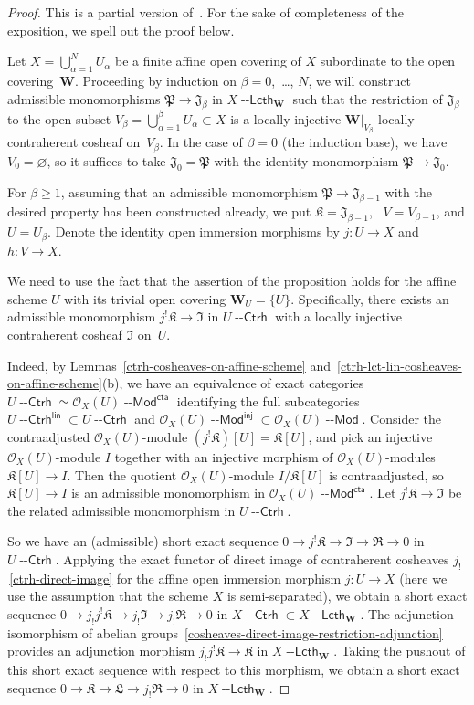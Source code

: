 \documentclass[12pt,a4paper]{amsart}
\newcommand{\+}{\nobreakdash-}
\renewcommand{\:}{\colon}
\newcommand{\rarrow}{\longrightarrow}
\newcommand{\Modl}{{\operatorname{\mathsf{--Mod}}}}
\newcommand{\Ctrh}{{\operatorname{\mathsf{--Ctrh}}}}
\newcommand{\Lcth}{{\operatorname{\mathsf{--Lcth}}}}
\newcommand{\inj}{\mathsf{inj}}
\newcommand{\cta}{\mathsf{cta}}
\newcommand{\lin}{\mathsf{lin}}
\newcommand{\bW}{\mathbf W}
\newcommand{\cO}{\mathcal O}
\newcommand{\fI}{\mathfrak I}
\newcommand{\fJ}{\mathfrak J}
\newcommand{\fK}{\mathfrak K}
\newcommand{\fL}{\mathfrak L}
\newcommand{\fP}{\mathfrak P}
\newcommand{\fR}{\mathfrak R}
\theoremstyle{plain}
\theoremstyle{definition}
\begin{document}
\begin{proof}
 This is a partial version of~\cite[Lemma~4.3.2(a)]{Pcosh}.
 For the sake of completeness of the exposition, we spell out
the proof below.

 Let $X=\bigcup_{\alpha=1}^N U_\alpha$ be a finite affine open covering
of $X$ subordinate to the open covering~$\bW$.
 Proceeding by induction on $\beta=0$,~\dots, $N$, we will construct
admissible monomorphisms $\fP\rarrow\fJ_\beta$ in $X\Lcth_\bW$ such
that the restriction of $\fJ_\beta$ to the open subset
$V_\beta=\bigcup_{\alpha=1}^\beta U_\alpha\subset X$ is a locally
injective $\bW|_{V_\beta}$\+locally contraherent cosheaf on~$V_\beta$.
 In the case of $\beta=0$ (the induction base), we have
$V_0=\varnothing$, so it suffices to take $\fJ_0=\fP$ with the identity
monomorphism $\fP\rarrow\fJ_0$.

 For $\beta\ge1$, assuming that an admissible monomorphism
$\fP\rarrow\fJ_{\beta-1}$ with the desired property has been
constructed already, we put $\fK=\fJ_{\beta-1}$, \ $V=V_{\beta-1}$,
and $U=U_\beta$.
 Denote the identity open immersion morphisms by $j\:U\rarrow X$
and $h\:V\rarrow X$.

 We need to use the fact that the assertion of the proposition holds
for the affine scheme $U$ with its trivial open covering $\bW_U=\{U\}$.
 Specifically, there exists an admissible monomorphism
$j^!\fK\rarrow\fI$ in $U\Ctrh$ with a locally injective contraherent
cosheaf $\fI$ on~$U$.

 Indeed, by Lemmas~\ref{ctrh-cosheaves-on-affine-scheme}
and~\ref{ctrh-lct-lin-cosheaves-on-affine-scheme}(b), we have
an equivalence of exact categories $U\Ctrh\simeq\cO_X(U)\Modl^\cta$
identifying the full subcategories $U\Ctrh^\lin\subset U\Ctrh$
and $\cO_X(U)\Modl^\inj\subset\cO_X(U)\Modl$.
 Consider the contraadjusted $\cO_X(U)$\+module $(j^!\fK)[U]=\fK[U]$,
and pick an injective $\cO_X(U)$\+module $I$ together with
an injective morphism of $\cO_X(U)$\+modules $\fK[U]\rarrow I$.
 Then the quotient $\cO_X(U)$\+module $I/\fK[U]$ is contraadjusted,
so $\fK[U]\rarrow I$ is an admissible monomorphism in
$\cO_X(U)\Modl^\cta$.
 Let $j^!\fK\rarrow\fI$ be the related admissible monomorphism in
$U\Ctrh$.

 So we have an (admissible) short exact sequence $0\rarrow j^!\fK
\rarrow\fI\rarrow\fR\rarrow0$ in $U\Ctrh$.
 Applying the exact functor of direct image of contraherent
cosheaves $j_!$ \,\eqref{ctrh-direct-image} for the affine open
immersion morphism $j\:U\rarrow X$ (here we use the assumption that
the scheme $X$ is semi-separated), we obtain a short exact sequence
$0\rarrow j_!j^!\fK\rarrow j_!\fI\rarrow j_!\fR\rarrow0$ in
$X\Ctrh\subset X\Lcth_\bW$.
 The adjunction isomorphism of abelian
groups~\eqref{cosheaves-direct-image-restriction-adjunction} provides
an adjunction morphism $j_!j^!\fK\rarrow\fK$ in $X\Lcth_\bW$.
 Taking the pushout of this short exact sequence with respect to
this morphism, we obtain a short exact sequence
$0\rarrow\fK\rarrow\fL\rarrow j_!\fR\rarrow0$ in $X\Lcth_\bW$.


\end{proof}
\end{document}
